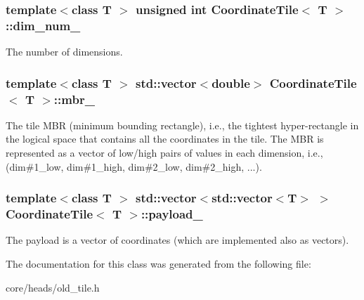 \subsubsection[{dim\+\_\+num\+\_\+}]{\setlength{\rightskip}{0pt plus 5cm}template$<$class T $>$ unsigned int {\bf Coordinate\+Tile}$<$ T $>$\+::dim\+\_\+num\+\_\+\hspace{0.3cm}{\ttfamily [private]}}\label{classCoordinateTile_a1c4f8a58ab5a9848463901280d91fe54}
The number of dimensions. \hypertarget{classCoordinateTile_adfff0b1c24ab71f4d67784efff84ce68}{}
\subsubsection[{mbr\+\_\+}]{\setlength{\rightskip}{0pt plus 5cm}template$<$class T $>$ std\+::vector$<$double$>$ {\bf Coordinate\+Tile}$<$ T $>$\+::mbr\+\_\+\hspace{0.3cm}{\ttfamily [private]}}\label{classCoordinateTile_adfff0b1c24ab71f4d67784efff84ce68}
The tile M\+B\+R (minimum bounding rectangle), i.\+e., the tightest hyper-\/rectangle in the logical space that contains all the coordinates in the tile. The M\+B\+R is represented as a vector of low/high pairs of values in each dimension, i.\+e., (dim\#1\+\_\+low, dim\#1\+\_\+high, dim\#2\+\_\+low, dim\#2\+\_\+high, ...). \hypertarget{classCoordinateTile_a3c8f3045b9d989d2a4313fb65b23e48d}{}
\subsubsection[{payload\+\_\+}]{\setlength{\rightskip}{0pt plus 5cm}template$<$class T $>$ std\+::vector$<$std\+::vector$<$T$>$ $>$ {\bf Coordinate\+Tile}$<$ T $>$\+::payload\+\_\+\hspace{0.3cm}{\ttfamily [private]}}\label{classCoordinateTile_a3c8f3045b9d989d2a4313fb65b23e48d}
The payload is a vector of coordinates (which are implemented also as vectors). 

The documentation for this class was generated from the following file\+:\begin{DoxyCompactItemize}
\item 
core/heads/old\+\_\+tile.\+h\end{DoxyCompactItemize}
